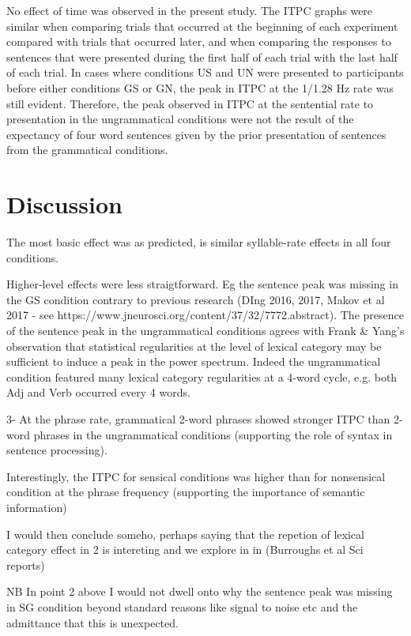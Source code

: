 \documentclass[a4paper,10pt,twoside]{article}
\begin{document}
{No effect of time was observed in the present study. The ITPC graphs
were similar when comparing trials that occurred at the beginning of
each experiment compared with trials that occurred later, and when
comparing the responses to sentences that were presented during the
first half of each trial with the last half of each trial. In cases
where conditions US and UN were presented to participants before
either conditions GS or GN, the peak in ITPC at the 1/1.28 Hz rate was
still evident. Therefore, the peak observed in ITPC at the sentential
rate to presentation in the ungrammatical conditions were not the
result of the expectancy of four word sentences given by the prior
presentation of sentences from the grammatical conditions.

\section*{Discussion}

The most basic effect was as predicted, is similar syllable-rate
effects in all four conditions.

Higher-level effects were less straigtforward. Eg the sentence peak
was missing in the GS condition contrary to previous research (DIng
2016, 2017, Makov et al 2017 - see
https://www.jneurosci.org/content/37/32/7772.abstract). The presence
of the sentence peak in the ungrammatical conditions agrees with Frank
& Yang's observation that statistical regularities at the level of
lexical category may be sufficient to induce a peak in the power
spectrum. Indeed the ungrammatical condition featured many lexical
category regularities at a 4-word cycle, e.g. both Adj and Verb
occurred every 4 words.

3- At the phrase rate, grammatical 2-word
phrases showed stronger ITPC than 2-word phrases in the ungrammatical
conditions (supporting the role of syntax in sentence
processing).

Interestingly, the ITPC for sensical conditions was higher than for
nonsensical condition at the phrase frequency (supporting the
importance of semantic information)

I would then conclude someho,
perhaps saying that the repetion of lexical category effect in 2 is
intereting and we explore in in (Burroughs et al Sci reports)

NB In
point 2 above I would not dwell onto why the sentence peak was missing
in SG condition beyond standard reasons like signal to noise etc and
the admittance that this is unexpected.

}
\end{document}
